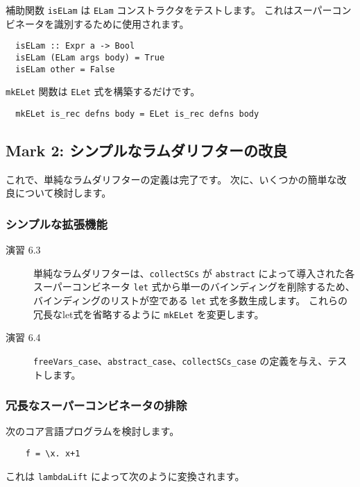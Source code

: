 \documentclass{jarticle}
\begin{document}
補助関数 \texttt{isELam} は \texttt{ELam} コンストラクタをテストします。
これはスーパーコンビネータを識別するために使用されます。

\begin{verbatim}
  isELam :: Expr a -> Bool
  isELam (ELam args body) = True
  isELam other = False
\end{verbatim}

\texttt{mkELet} 関数は \texttt{ELet} 式を構築するだけです。

\begin{verbatim}
  mkELet is_rec defns body = ELet is_rec defns body
\end{verbatim}

\subsection{Mark 2: シンプルなラムダリフターの改良}

これで、単純なラムダリフターの定義は完了です。
次に、いくつかの簡単な改良について検討します。

\subsubsection{シンプルな拡張機能}

\begin{description}
	\item[演習 6.3] 単純なラムダリフターは、\texttt{collectSCs} が \texttt{abstract} によって導入された各スーパーコンビネータ \texttt{let} 式から単一のバインディングを削除するため、バインディングのリストが空である \texttt{let} 式を多数生成します。
		これらの冗長なlet式を省略するように \texttt{mkELet} を変更します。
	\item[演習 6.4] \texttt{freeVars\_case}、\texttt{abstract\_case}、\texttt{collectSCs\_case} の定義を与え、テストします。
\end{description}

\subsubsection{冗長なスーパーコンビネータの排除}

次のコア言語プログラムを検討します。

\begin{verbatim}
    f = \x. x+1
\end{verbatim}

これは \texttt{lambdaLift} によって次のように変換されます。
\end{document}

